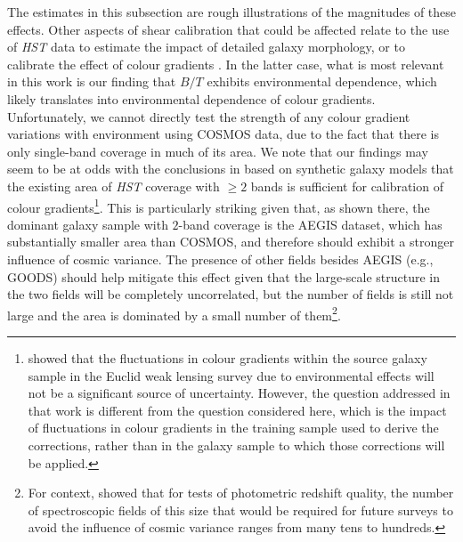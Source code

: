 \documentclass[twocolumn,useAMS,usenatbib]{mn2e}
\begin{document}
The estimates in this subsection are rough illustrations of
  the magnitudes of these effects.  Other aspects of shear calibration
  that could be affected relate to the use of {\em HST} data to
  estimate the impact of detailed galaxy morphology, or to calibrate
  the effect of colour gradients
  \citep{2012MNRAS.421.1385V,2013MNRAS.432.2385S}.  In the latter
  case, what is most relevant in this work is our finding that $B/T$
  exhibits environmental dependence, which likely translates into
  environmental dependence of colour gradients.  Unfortunately, we
  cannot directly test the strength of any colour gradient variations
  with environment using COSMOS data, due to the fact that there is
  only single-band coverage in much of its area.  We note that our
  findings may seem to be at odds with the conclusions in
  \cite{2013MNRAS.432.2385S} based on synthetic galaxy models that the
  existing area of {\em HST} coverage with $\ge 2$ bands is sufficient
  for calibration of colour
  gradients\footnote{\cite{2012MNRAS.421.1385V} showed that the
    fluctuations in colour gradients within the source galaxy sample
    in the Euclid weak lensing survey due to environmental effects
    will not be a significant source of uncertainty.  However, the
    question addressed in that work is different from the question
    considered here, which is the impact of fluctuations in colour
    gradients in the training sample used to derive the corrections,
    rather than in the galaxy sample to which those corrections will
    be applied.}.  This is particularly striking given that, as shown
  there, the dominant galaxy sample with $2$-band coverage is the
  AEGIS dataset, which has substantially smaller area than COSMOS, and
  therefore should exhibit a stronger influence of cosmic variance.
  The presence of other fields besides AEGIS (e.g., GOODS)
    should help mitigate this effect given that the large-scale
    structure in the two fields will be completely uncorrelated, but
    the number of fields is still not large and the area is dominated
    by a small number of them\footnote{For context,
        \cite{2015APh....63...81N} 
        showed that for tests of photometric redshift quality, the
        number of spectroscopic fields of this size that would be
        required for future surveys to avoid the influence of cosmic
        variance ranges from many tens to hundreds.}.
\end{document}
